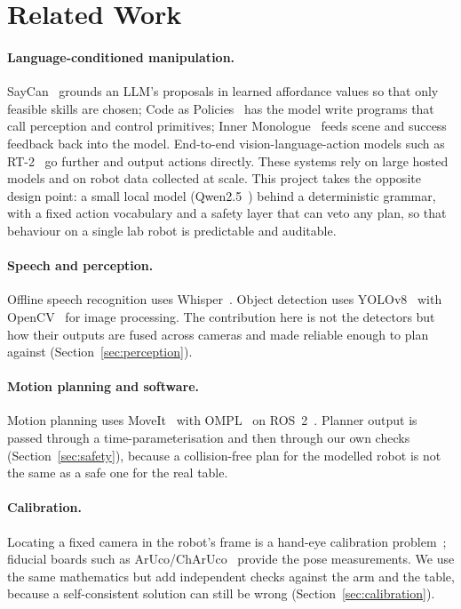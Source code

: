 \documentclass[12pt]{article}
\begin{document}
\section{Related Work}

\paragraph{Language-conditioned manipulation.}
SayCan~\cite{ahn2022saycan} grounds an LLM's proposals in learned affordance values so that only feasible skills are chosen; Code as Policies~\cite{liang2023codeaspolicies} has the model write programs that call perception and control primitives; Inner Monologue~\cite{huang2022innermonologue} feeds scene and success feedback back into the model. End-to-end vision-language-action models such as RT-2~\cite{brohan2023rt2} go further and output actions directly. These systems rely on large hosted models and on robot data collected at scale. This project takes the opposite design point: a small local model (Qwen2.5~\cite{qwen2024qwen25}) behind a deterministic grammar, with a fixed action vocabulary and a safety layer that can veto any plan, so that behaviour on a single lab robot is predictable and auditable.

\paragraph{Speech and perception.}
Offline speech recognition uses Whisper~\cite{radford2023whisper}. Object detection uses YOLOv8~\cite{jocher2023yolov8} with OpenCV~\cite{bradski2000opencv} for image processing. The contribution here is not the detectors but how their outputs are fused across cameras and made reliable enough to plan against (Section~\ref{sec:perception}).

\paragraph{Motion planning and software.}
Motion planning uses MoveIt~\cite{coleman2014moveit} with OMPL~\cite{sucan2012ompl} on ROS~2~\cite{macenski2022ros2}. Planner output is passed through a time-parameterisation and then through our own checks (Section~\ref{sec:safety}), because a collision-free plan for the modelled robot is not the same as a safe one for the real table.

\paragraph{Calibration.}
Locating a fixed camera in the robot's frame is a hand-eye calibration problem~\cite{tsai1989handeye,park1994handeye}; fiducial boards such as ArUco/ChArUco~\cite{garridojurado2014aruco} provide the pose measurements. We use the same mathematics but add independent checks against the arm and the table, because a self-consistent solution can still be wrong (Section~\ref{sec:calibration}).
\end{document}
